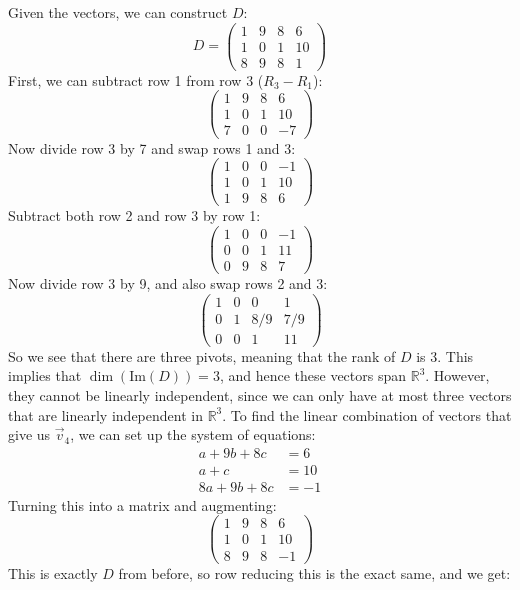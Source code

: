 \documentclass[10pt]{article}
\begin{document}
\begin{enumerate}[label=\alph*)]
			\begin{solution}
				Given the vectors, we can construct $D$:
				\[
					D = \begin{pmatrix} 1 & 9 & 8 & 6\\1 & 0 & 1 & 10\\8 & 9 & 8 & 1 \end{pmatrix} 
				\] 
				First, we can subtract row 1 from row 3 ($R_3 - R_1$):
				\[
					\begin{pmatrix} 1 & 9 & 8 & 6\\1 &0 & 1 & 10\\7 & 0 & 0 & -7 \end{pmatrix} 
				\] 
				Now divide row 3 by 7 and swap rows 1 and 3:
				\[
					\begin{pmatrix} 1 & 0 & 0 & -1\\1 & 0 & 1 & 10\\ 1 & 9 & 8 & 6 \end{pmatrix} 
				\] 
				Subtract both row 2 and row 3 by row 1:
				\[
					\begin{pmatrix} 1 & 0 & 0 & -1 \\ 0 & 0 & 1 & 11\\ 0 & 9 & 8 & 7\end{pmatrix} 
				\] 
				Now divide row 3 by 9, and also swap rows 2 and 3:
				\[
					\begin{pmatrix} 1 & 0 & 0 & 1\\ 0 & 1 & 8 / 9 & 7 /9\\ 0 & 0 & 1 & 11 \end{pmatrix} 
				\] 
				So we see that there are three pivots, meaning that the rank of $D$ is 3. This implies that
				$\dim(\mathrm{Im}(D)) = 3$, and hence these vectors span $\mathbb R^3$. However, they cannot 
				be linearly independent, since we can only have at most three vectors that are linearly 
				independent in $\mathbb R^3$. To find the linear combination of vectors that give us $\vec v_4$,
				we can set up the system of equations:
				\begin{align*}
					a + 9b + 8c &= 6 \\
					a + c &= 10\\
					8a + 9b + 8c &= -1
				\end{align*}
				Turning this into a matrix and augmenting: 
				\[
					\begin{pmatrix} 1 & 9 & 8 & 6\\1 &0&1&10\\8&9&8&-1 \end{pmatrix} 
				\] 
				This is exactly $D$ from before, so row reducing this is the exact same, and we get:

\end{solution}
\end{enumerate}
\end{document}
